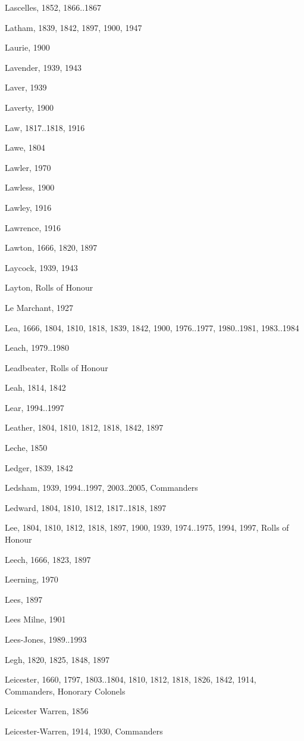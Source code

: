 \begin{theindex}
\item Lascelles, 1852, 1866..1867
\item Latham, 1839, 1842, 1897, 1900, 1947
\item Laurie, 1900
\item Lavender, 1939, 1943
\item Laver, 1939
\item Laverty, 1900
\item Law, 1817..1818, 1916
\item Lawe, 1804
\item Lawler, 1970
\item Lawless, 1900
\item Lawley, 1916
\item Lawrence, 1916
\item Lawton, 1666, 1820, 1897
\item Laycock, 1939, 1943
\item Layton, Rolls of Honour
\item Le Marchant, 1927
\item Lea, 1666, 1804, 1810, 1818, 1839, 1842, 1900, 1976..1977, 1980..1981, 1983..1984
\item Leach, 1979..1980
\item Leadbeater, Rolls of Honour
\item Leah, 1814, 1842
\item Lear, 1994..1997
\item Leather, 1804, 1810, 1812, 1818, 1842, 1897
\item Leche, 1850
\item Ledger, 1839, 1842
\item Ledsham, 1939, 1994..1997, 2003..2005, Commanders
\item Ledward, 1804, 1810, 1812, 1817..1818, 1897
\item Lee, 1804, 1810, 1812, 1818, 1897, 1900, 1939, 1974..1975, 1994, 1997, Rolls of Honour
\item Leech, 1666, 1823, 1897
\item Leerning, 1970
\item Lees, 1897
\item Lees Milne, 1901
\item Lees-Jones, 1989..1993
\item Legh, 1820, 1825, 1848, 1897
\item Leicester, 1660, 1797, 1803..1804, 1810, 1812, 1818, 1826, 1842, 1914, Commanders, Honorary Colonels
\item Leicester Warren, 1856
\item Leicester-Warren, 1914, 1930, Commanders

\end{theindex}

